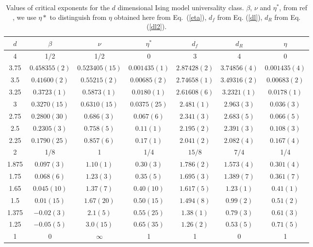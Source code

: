 \documentclass[pre,aps,twocolumn,showpacs,floatfix,nofootinbib,superscriptaddress,linenumbers]{revtex4-1}
\begin{document}
\begin{table}[t]

\begin{tabular}{c|cccccc} \hline\hline
$d$     & $\beta$                           & $\nu$                             & $\eta^*$                            & $d_f$ & $d_R$ & $\eta$ \\ \hline
4     & 1/2                            & 1/2                            & 0                              &  3   &  4 & 0\\
3.75  & $0.458355(2)$ & $0.523405 (15)$ & $0.001435(1)$ &  $2.87428(2)$  &  $3.74856(4)$ &  $0.001435(4)$  \\
3.5   & $0.41600(2)$  & $0.55215(2)$  & $0.00685(2)$  &  $2.74658(1)$  &  $3.49316(2)$ &  $0.00683(2)$ \\
3.25  & $0.3723(1)$   & $0.5873(1)$   & $0.0180(1)$   &  $2.61608(6)$  &  $3.2321(1)$ & $0.0178(1)$ \\
3     & $0.3270(15)$   & $0.6310(15)$   & $0.0375(25)$   &  $2.481(1)$  & $2.963(3)$ & $0.036(3)$ \\
2.75  & $0.2800(30)$   & $0.686(3)$     & $0.067(6)$     &  $2.341(3)$  &  $2.683(5)$ & $0.066(5)$ \\
2.5   & $0.2305(3)$   & $0.758(5)$     & $0.11(1)$      &  $2.195(2)$  & $2.391(3)$ & $0.108(3)$ \\
2.25  & $0.1790(25)$   & $0.857(6)$     & $0.17(1)$      &  $2.041(2)$  & $2.082(4)$ & $0.167(4)$ \\
2     & 1/8     & 1      & 1/4   &  $15/8$  & $7/4$ &  1/4 \\
1.875 & $0.097(3)$     & $1.10(1)$      & $0.30(3)$      &  $1.786(2)$   & $1.573(4)$ & $0.301(4)$  \\
1.75  & $0.068(6)$     & $1.23(3)$      & $0.35(5)$      &  $1.695(3)$  & $1.389(7)$ & $0.361(7)$ \\
1.65  & $0.045(10)$    & $1.37(7)$      & $0.40(10)$     &  $1.617(5)$  & $1.23(1)$ & $0.41(1)$ \\
1.5   & $0.01(15)$    & $1.67(20)$     & $0.50(15)$  &  $1.494(8)$  & $0.99(2)$ &  $0.51(2)$ \\
1.375 & $-0.02(3)$     & $2.1(5)$       & $0.55(25)$     &  $1.38(1)$  & $0.79(3)$ & $0.61(3)$ \\
1.25  & $-0.05(5)$     & $3.0(15)$      & $0.65(35)$     &  $1.26(2)$   &  $0.53(5)$ & $0.71(5)$ \\
1     & 0                              & $\infty$       & 1                              &  1  & 0 & 1 \\ \hline\hline
\end{tabular}
\caption{Values of critical exponents for  the $d$ dimensional Ising model universality class. $\beta$, $\nu$ and $\eta^*$, from ref  \cite{Guillou87}, we use $\eta*$ to distinguish from $\eta$ obtained here from Eq.\ (\ref{eta}), $d_f$ from Eq. (\ref{dl}), $d_R$ from  Eq. (\ref{dl2}).}
\label{Table1}

\end{table}
\end{document}
